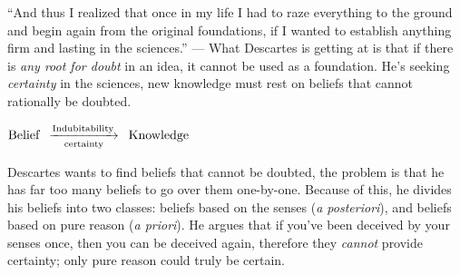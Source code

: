 \documentclass{article}
\begin{document}
\begin{spacing}{1.2}
    ``And thus I realized that once in my life I had to raze everything to the
    ground and begin again from the original foundations, if I wanted to establish
    anything firm and lasting in the sciences.''%
\footnotemark[1]%
    --- What Descartes is getting at is that if there is \emph{any root for doubt}
    in an idea, it cannot be used as a foundation. He's seeking \emph{certainty}
    in the sciences, new knowledge must rest on beliefs that cannot rationally
    be doubted. 
    
    \begin{center}
        \(\text{Belief}\hspace{5pt}\underset{\text{certainty}}{\xrightarrow{%
        \text{Indubitability}}}\hspace{5pt}\text{Knowledge}\)
    \end{center}

    Descartes wants to find beliefs that cannot be doubted, the problem is that
    he has far too many beliefs to go over them one-by-one. Because of this, 
    he divides his beliefs into two classes: beliefs based on the senses 
    (\emph{a posteriori}), and beliefs based on pure reason (\emph{a priori}).
    He argues that if you've been deceived by your senses once, then you can be
    deceived again, therefore they \emph{cannot} provide certainty; only pure
    reason could truly be certain.




    \end{spacing}
    
\end{document}
